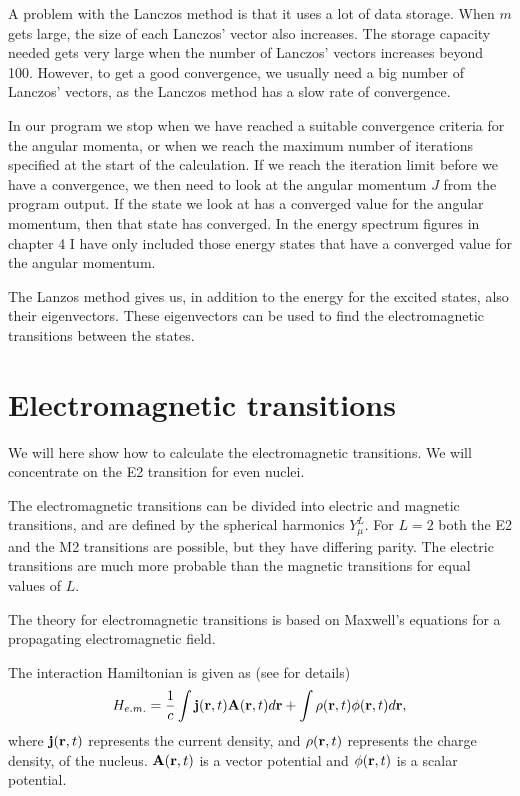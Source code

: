 A problem with the Lanczos method is that it uses a lot of data storage. When
$m$ gets large, the size of each Lanczos' vector also increases. The storage
capacity needed gets very large when the number of Lanczos' vectors increases
beyond 100. However, to get a good convergence, we usually need a big number of
Lanczos' vectors, as the Lanczos method has a slow rate of convergence.

In our program we stop when we have reached a suitable convergence criteria for
the angular momenta, or when we reach the maximum number of iterations
specified at the start of the calculation. If we reach the iteration limit
before we have a convergence, we then need to look at the angular momentum $J$
from the program output. If the state we look at has a converged value for the
angular momentum, then that state has converged. In the energy spectrum
figures in chapter 4 I have only included those energy states that have a
converged value for the angular momentum.

The Lanzos method gives us, in addition to the energy for the excited states,
also their eigenvectors. These eigenvectors can be used to find the
electromagnetic transitions between the states.

\section{Electromagnetic transitions}

We will here show how to calculate the electromagnetic transitions. We will
concentrate on the E2 transition for even nuclei.

The electromagnetic transitions can be divided into electric and magnetic
transitions, and are defined by the spherical harmonics $Y_\mu^L$. For $L = 2$
both the E2 and the M2 transitions are possible, but they have differing
parity. The electric transitions are much more probable than the magnetic
transitions for equal values of $L$.

The theory for electromagnetic transitions is based on Maxwell's equations for
a propagating electromagnetic field.

The interaction Hamiltonian is given as (see \citet{brussaard} for details)
\begin{align}
	H_{e.m.} = \frac1c\int\mathbf j(\mathbf r,t)\mathbf A(\mathbf r,t)d\mathbf r + \int\rho(\mathbf r,t)\phi(\mathbf r,t)d\mathbf r,
\end{align}
where $\mathbf j(\mathbf r,t)$ represents the current density, and $\rho(\mathbf r,t)$ represents
the charge density, of the nucleus. $\mathbf A(\mathbf r,t)$ is a vector potential and
$\phi(\mathbf r,t)$ is a scalar potential.

